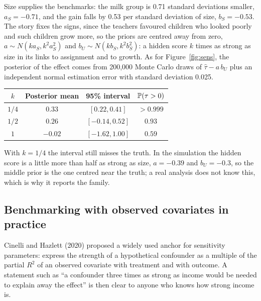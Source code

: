 Size supplies the benchmarks: the milk group is 0.71 standard deviations smaller, $a_S = -0.71$, and the gain falls by 0.53 per standard deviation of size, $b_S = -0.53$. The story fixes the signs, since the teachers favoured children who looked poorly and such children grow more, so the priors are centred away from zero, $a \sim N(k a_S, k^2 a_S^2)$ and $b_U \sim N(k b_S, k^2 b_S^2)$: a hidden score $k$ times as strong as size in its links to assignment and to growth. As for Figure~\ref{fig:sens}, the posterior of the effect comes from 200,000 Monte Carlo draws of $\hat\tau - a\,b_U$ plus an independent normal estimation error with standard deviation 0.025.
\begin{center}
\begin{tabular}{cccc}
\toprule
$k$ & Posterior mean & 95\% interval & $\mathbb{P}(\tau > 0)$ \\
\midrule
$1/4$ & $0.33$ & $[0.22, 0.41]$ & $> 0.999$ \\
$1/2$ & $0.26$ & $[-0.14, 0.52]$ & $0.93$ \\
$1$ & $-0.02$ & $[-1.62, 1.00]$ & $0.59$ \\
\bottomrule
\end{tabular}
\end{center}
With $k = 1/4$ the interval still misses the truth. In the simulation the hidden score is a little more than half as strong as size, $a = -0.39$ and $b_U = -0.3$, so the middle prior is the one centred near the truth; a real analysis does not know this, which is why it reports the family.

\subsection{Benchmarking with observed covariates in practice}

Cinelli and Hazlett (2020) proposed a widely used anchor for sensitivity parameters: express the strength of a hypothetical confounder as a multiple of the partial $R^2$ of an observed covariate with treatment and with outcome. A statement such as ``a confounder three times as strong as income would be needed to explain away the effect'' is then clear to anyone who knows how strong income is.

